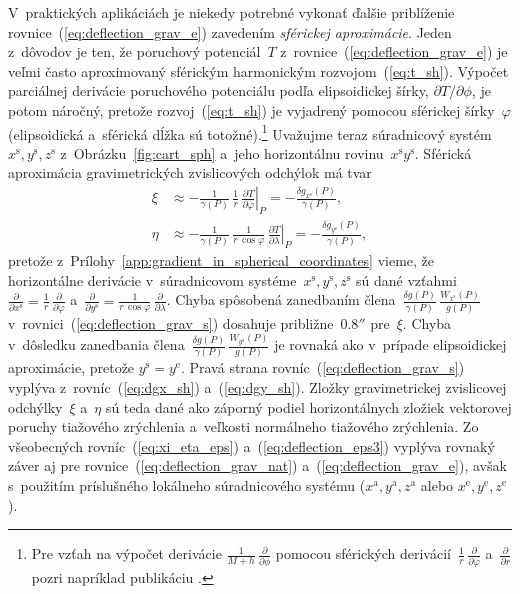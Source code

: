 \documentclass[a4paper, 12pt]{book}
\begin{document}
V~praktických aplikáciách je niekedy potrebné vykonať ďalšie priblíženie 
rovnice~(\ref{eq:deflection_grav_e}) zavedením \emph{sférickej aproximácie}.  
Jeden z~dôvodov je ten, že poruchový potenciál~$T$ 
z~rovnice~(\ref{eq:deflection_grav_e}) je veľmi často aproximovaný sférickým 
harmonickým rozvojom~(\ref{eq:t_sh}).  Výpočet parciálnej derivácie poruchového 
potenciálu podľa elipsoidickej šírky, $\partial T / \partial \phi$, je potom 
náročný, pretože rozvoj~(\ref{eq:t_sh}) je vyjadrený pomocou sférickej 
šírky~$\varphi$ (elipsoidická a~sférická dĺžka sú totožné).\footnote{Pre vzťah 
na výpočet derivácie $\frac{1}{M + h} \, \frac{\partial}{\partial\phi}$ pomocou 
sférických derivácií~$\frac{1}{r} \, \frac{\partial}{\partial \varphi}$ 
a~$\frac{\partial}{\partial r}$ pozri napríklad publikáciu 
\textcite{Jekeli1999b}.}  Uvažujme teraz súradnicový systém~$x^\mathrm{s}, 
y^\mathrm{s}, z^\mathrm{s}$ z~Obrázku~\ref{fig:cart_sph} a~jeho horizontálnu 
rovinu~$x^\mathrm{s}y^\mathrm{s}$.  Sférická aproximácia gravimetrických 
zvislicových odchýlok má tvar \parencite{Jekeli1999b}
%
\begin{equation}
\label{eq:deflection_grav_s}
\begin{split}
\xi &\approx -\frac{1}{\gamma(P)} \, \frac{1}{r} \, \left.\frac{\partial 
T}{\partial \varphi}\right|_P = -\frac{\delta 
g_{x^\mathrm{s}}(P)}{\gamma(P)}{,}\\
%
\eta &\approx -\frac{1}{\gamma(P)} \, \frac{1}{r \, \cos\varphi} \, 
\left.\frac{\partial T}{\partial \lambda}\right|_P = -\frac{\delta 
g_{y^\mathrm{s}}(P)}{\gamma(P)}{,}
\end{split}
\end{equation}
%
pretože z~Prílohy~\ref{app:gradient_in_spherical_coordinates} vieme, že 
horizontálne derivácie v~súradnicovom systéme~$x^\mathrm{s}, y^\mathrm{s}, 
z^\mathrm{s}$ sú dané vzťahmi~$\frac{\partial}{\partial x^\mathrm{s}} 
= \frac{1}{r} \, \frac{\partial}{\partial\varphi}$ a~$\frac{\partial}{\partial 
y^\mathrm{s}} = \frac{1}{r \, \cos\varphi} \, 
\frac{\partial}{\partial\lambda}$.  Chyba spôsobená zanedbaním 
člena~$\frac{\delta g(P)}{\gamma(P)} \, \frac{W_{x^\mathrm{s}}(P)}{g(P)}$ 
v~rovnici~(\ref{eq:deflection_grav_s}) dosahuje približne~$0.8''$ pre~$\xi$.  
Chyba v~dôsledku zanedbania člena~$\frac{\delta g(P)}{\gamma(P)} \, 
\frac{W_{y^\mathrm{s}}(P)}{g(P)}$ je rovnaká ako v~prípade elipsoidickej 
aproximácie, pretože $y^\mathrm{s} = y^\mathrm{e}$.  Pravá strana 
rovníc~(\ref{eq:deflection_grav_s}) vyplýva z~rovníc~(\ref{eq:dgx_sh}) 
a~(\ref{eq:dgy_sh}).  Zložky gravimetrickej zvislicovej odchýlky~$\xi$ a~$\eta$ 
sú teda dané ako záporný podiel horizontálnych zložiek vektorovej poruchy 
tiažového zrýchlenia a~veľkosti normálneho tiažového zrýchlenia.  Zo 
všeobecných rovníc~(\ref{eq:xi_eta_eps}) a~(\ref{eq:deflection_eps3}) vyplýva 
rovnaký záver aj pre rovnice~(\ref{eq:deflection_grav_nat}) 
a~(\ref{eq:deflection_grav_e}), avšak s~použitím príslušného lokálneho 
súradnicového systému ($x^\mathrm{a}, y^\mathrm{a}, z^\mathrm{a}$ alebo 
$x^\mathrm{e}, y^\mathrm{e}, z^\mathrm{e}$).
\end{document}
